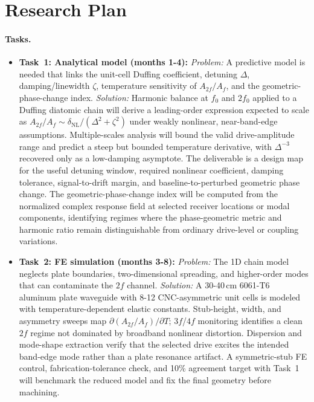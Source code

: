 \documentclass[11pt]{article}
\begin{document}
\section{Research Plan}

\paragraph{Tasks.}
\begin{itemize}[noitemsep]
  \item \textbf{Task~1: Analytical model (months 1-4):} \emph{Problem:} A predictive model is needed that links the unit-cell Duffing coefficient, detuning $\Delta$, damping/linewidth $\zeta$, temperature sensitivity of $A_{2f}/A_f$, and the geometric-phase-change index. \emph{Solution:} Harmonic balance at $f_0$ and $2f_0$ applied to a Duffing diatomic chain will derive a leading-order expression expected to scale as $A_{2f}/A_f \sim \delta_\mathrm{NL}/(\Delta^2+\zeta^2)$ under weakly nonlinear, near-band-edge assumptions. Multiple-scales analysis will bound the valid drive-amplitude range and predict a steep but bounded temperature derivative, with $\Delta^{-3}$ recovered only as a low-damping asymptote. The deliverable is a design map for the useful detuning window, required nonlinear coefficient, damping tolerance, signal-to-drift margin, and baseline-to-perturbed geometric phase change. The geometric-phase-change index will be computed from the normalized complex response field at selected receiver locations or modal components, identifying regimes where the phase-geometric metric and harmonic ratio remain distinguishable from ordinary drive-level or coupling variations.

  \item \textbf{Task~2: FE simulation (months 3-8):} \emph{Problem:} The 1D chain model neglects plate boundaries, two-dimensional spreading, and higher-order modes that can contaminate the $2f$ channel. \emph{Solution:} A 30-40\,cm 6061-T6 aluminum plate waveguide with 8-12 CNC-asymmetric unit cells is modeled with temperature-dependent elastic constants. Stub-height, width, and asymmetry sweeps map $\partial(A_{2f}/A_f)/\partial T$; $3f$/$4f$ monitoring identifies a clean $2f$ regime not dominated by broadband nonlinear distortion. Dispersion and mode-shape extraction verify that the selected drive excites the intended band-edge mode rather than a plate resonance artifact. A symmetric-stub FE control, fabrication-tolerance check, and 10\% agreement target with Task~1 will benchmark the reduced model and fix the final geometry before machining.


\end{itemize}
\end{document}
